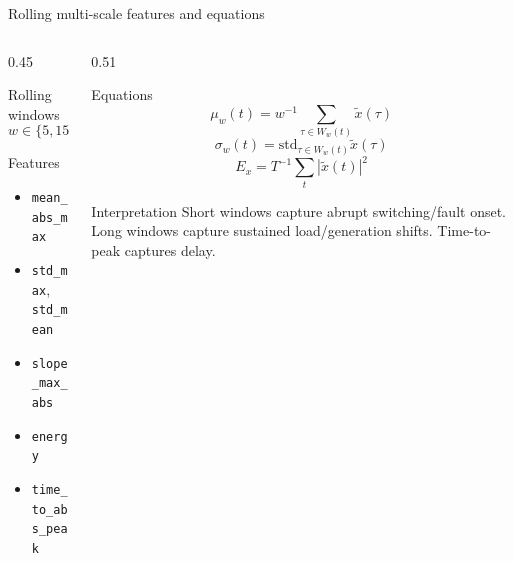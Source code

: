 ﻿\documentclass[10pt,aspectratio=169]{beamer}
\newcommand{\code}[1]{\texttt{\footnotesize #1}}
\begin{document}
\fi
\begin{frame}{Rolling multi-scale features and equations}
\small
\begin{columns}[T,totalwidth=\textwidth]
\begin{column}{0.45\textwidth}
\begin{block}{Rolling windows}
\[
w \in \{5,15,30,60,120\}
\]
\end{block}
\begin{block}{Features}
\begin{itemize}
  \item \code{mean\_abs\_max}
  \item \code{std\_max}, \code{std\_mean}
  \item \code{slope\_max\_abs}
  \item \code{energy}
  \item \code{time\_to\_abs\_peak}
\end{itemize}
\end{block}
\end{column}
\begin{column}{0.51\textwidth}
\begin{block}{Equations}
\[
\mu_w(t)=w^{-1}\sum_{\tau\in W_w(t)}\tilde{x}(\tau)
\]
\[
\sigma_w(t)=\mathrm{std}_{\tau\in W_w(t)}\tilde{x}(\tau)
\]
\[
E_x=T^{-1}\sum_t|\tilde{x}(t)|^2
\]
\end{block}
\begin{exampleblock}{Interpretation}
Short windows capture abrupt switching/fault onset. Long windows capture sustained load/generation shifts. Time-to-peak captures delay.
\end{exampleblock}
\end{column}
\end{columns}
\end{frame}
\end{document}
